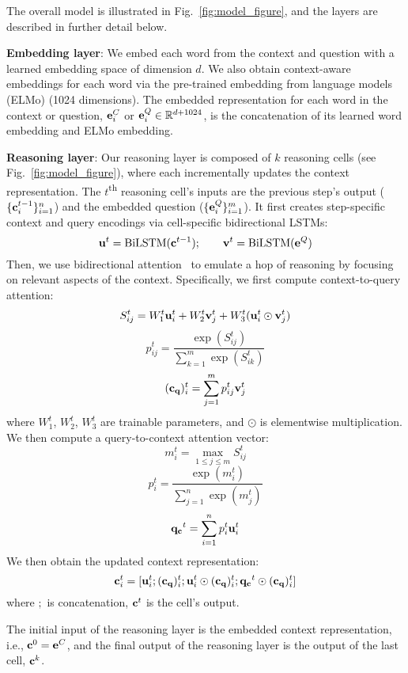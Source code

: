 \documentclass[11pt,a4paper]{article}
\newcommand{\R}{\mathbb{R}}
\def\figref#1{Fig.~\ref{#1}}
\newcommand\bvect[1]{{\bf #1}}
\begin{document}
The overall model is illustrated in \figref{fig:model_figure}, and the layers are described in further detail below.

\noindent\textbf{Embedding layer}:
We embed each word from the context and question with a learned embedding space of dimension $d$.
We also obtain context-aware embeddings for each word via the pre-trained embedding from language models (ELMo) (1024 dimensions).
The embedded representation for each word in the context or question, $\bvect{e}^C_i$ or $\bvect{e}^Q_i \in \R^{d + 1024}$, is the concatenation of its learned word embedding and ELMo embedding.


\noindent\textbf{Reasoning layer}: Our reasoning layer is composed of $k$ reasoning cells (see \figref{fig:model_figure}), where each incrementally updates the context representation.
The $t$\textsuperscript{th} reasoning cell's inputs are the previous step's output ($\{\bvect{c}^{t-1}_i\}_{i=1}^n$) and the embedded question ($\{\bvect{e}^Q_i\}_{i=1}^m$). It first creates step-specific context and query encodings via cell-specific bidirectional LSTMs:
\vspace{-3pt}
\[\bvect{u}^t = \text{BiLSTM}(\bvect{c}^{t-1}); \qquad \bvect{v}^t = \text{BiLSTM}(\bvect{e}^Q)\]
Then, we use bidirectional attention~\cite{seo2016bidirectional} to emulate a hop of reasoning by focusing on relevant aspects of the context.
Specifically, we first compute context-to-query attention:
\[S^t_{ij} = W_1^t \bvect{u}_i^t + W_2^t \bvect{v}_j^t + W_3^t (\bvect{u}_i^t \odot \bvect{v}_j^t)\]
\[p^t_{ij} = \frac{\exp(S_{ij}^t)}{\sum_{k=1}^m \exp(S_{ik}^t)}\]
\[(\bvect{c_q})_i^t = \sum_{j=1}^m p^t_{ij} \bvect{v}_j^t\]
where $W_1^t$, $W_2^t$, $W_3^t$ are trainable parameters, and $\odot$ is
elementwise multiplication.
We then compute a query-to-context attention vector:
\[m_i^t = \max_{1 \leq j \leq m} S^t_{ij}\]
\[p^t_i = \frac{\exp(m_i^t)}{\sum_{j=1}^n \exp(m_j^t)}\]
\[\bvect{q_c}^t = \sum_{i=1}^n p^t_i \bvect{u}_i^t\]
We then obtain the updated context representation:
\[\bvect{c}_i^{t} = [\bvect{u}_i^t ; (\bvect{c_q})_i^t ; \bvect{u}_i^t \odot (\bvect{c_q})_i^t ; \bvect{q_c}^t \odot (\bvect{c_q})_i^t]\]
where $;$ is concatenation, $\bvect{c}^t$ is the cell's output.



The initial input of the reasoning layer is the embedded context representation, i.e., $\bvect{c}^0 = \bvect{e}^C$, and the final output of the reasoning layer is the output of the last cell, $\bvect{c}^k$.
\end{document}
